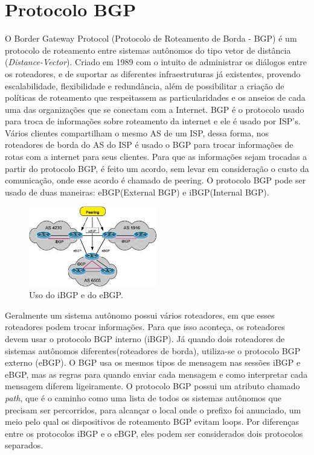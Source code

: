 \documentclass[12pt,a4paper]{report}
\begin{document}
\chapter{Protocolo BGP}
O Border Gateway Protocol (Protocolo de Roteamento de Borda - BGP) \'e um protocolo de roteamento entre sistemas aut\^onomos do tipo vetor de dist\^ancia (\textit{Distance-Vector}). Criado em 1989 com o intuito de administrar os di\'alogos entre os roteadores, e de suportar as diferentes infraestruturas j\'a existentes, provendo escalabilidade, flexibilidade e redund\^ancia, al\'em de possibilitar a cria\c{c}\~ao de pol\'iticas de roteamento que respeitassem as particularidades e os anseios de cada uma das organiza\c{c}\~oes que se conectam com a Internet. BGP \'e o protocolo usado para troca de informa\c{c}\~oes sobre roteamento da internet e ele \'e usado por ISP's. V\'arios clientes compartilham o mesmo AS de um ISP, dessa forma, nos roteadores de borda do AS do ISP \'e usado o BGP para trocar informa\c{c}\~oes de rotas com a internet para seus clientes. Para que as informa\c{c}\~oes sejam trocadas a partir do protocolo BGP, \'e feito um acordo, sem levar em considera\c{c}\~ao o custo da comunica\c{c}\~ao, onde esse acordo \'e chamado de peering. O protocolo BGP pode ser usado de duas maneiras: eBGP(External BGP) e iBGP(Internal BGP).

\begin{figure}[!htb]
 \centering
 \includegraphics[width=0.5\textwidth]{Imagens/figura2BGP.jpg}
  \caption{\label{fig:figura2BGP}  Uso do iBGP e do eBGP.\cite{Frederico}}
\end{figure}

Geralmente um sistema aut\^onomo possui v\'arios roteadores, em que esses roteadores podem trocar informa\c{c}\~oes. Para que isso aconte\c{c}a, os roteadores devem usar o protocolo BGP interno (iBGP). J\'a quando dois roteadores de sistemas aut\^onomos diferentes(roteadores de borda), utiliza-se o protocolo BGP externo (eBGP). O BGP usa os mesmos tipos de mensagem nas sess\~oes iBGP e eBGP, mas as regras para quando enviar cada mensagem e como interpretar cada mensagem diferem ligeiramente. O protocolo BGP possui um atributo chamado \textit{path}, que \'e o caminho como uma lista de todos os sistemas aut\^onomos que precisam ser percorridos, para alcan\c{c}ar o local onde o prefixo foi anunciado, um meio pelo qual os dispositivos de roteamento BGP evitam loops. Por diferen\c{c}as entre os protocolos iBGP e o eBGP, eles podem ser considerados dois protocolos separados.
\end{document}
